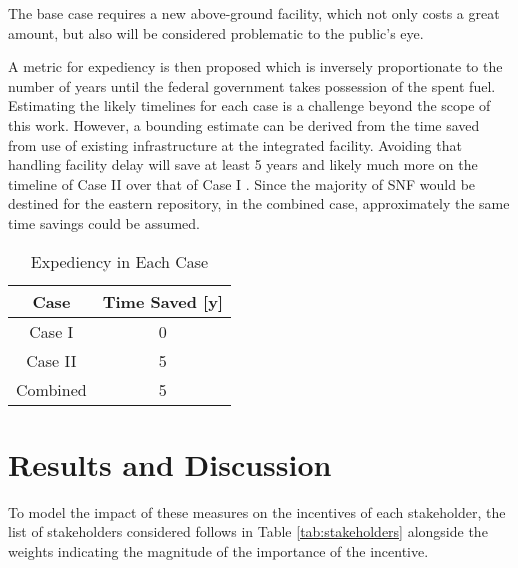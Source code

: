 The base case requires a new above-ground facility, which not only costs a great
amount, but also will be considered problematic to the public's eye. 




A metric for expediency is then proposed which is inversely proportionate to 
the number of years until the federal government takes possession of the spent 
fuel. Estimating the likely timelines for each case is a challenge beyond the 
scope of this work. However, a bounding estimate can be derived from the time 
saved from use of existing infrastructure at the integrated facility. Avoiding 
that handling facility delay will save at least 5 years 
and likely much more on the timeline of Case II over that of Case I 
\cite{doe_strategy_2013}. Since the 
majority of \gls{SNF} would be destined for the eastern repository, in the combined case,
 approximately the same time savings could be assumed.

\begin{table}[h]
	\centering
        \caption {Expediency in Each Case}
		\begin{tabular}{|c|c|}
			\hline
                        Case & Time Saved [y] \\
			\hline
			Case I & 0 \\
			Case II & 5 \\
			Combined & 5\\ 
			\hline
                \end{tabular}
\end{table}

\section{Results and Discussion} 

To model the impact of these measures on the incentives of each stakeholder, 
the list of stakeholders considered follows in Table \ref{tab:stakeholders} 
alongside the weights indicating the magnitude of the importance of the incentive.
 
